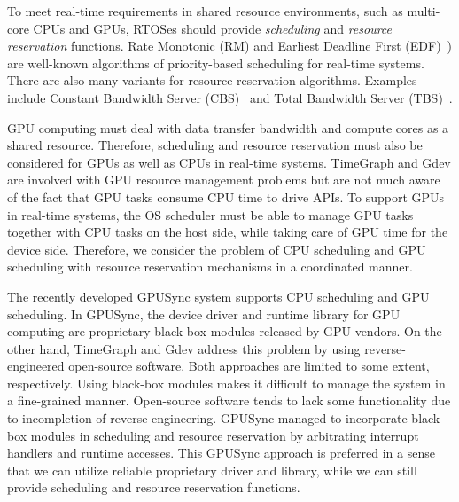 To meet real-time requirements in shared resource environments, such as
multi-core CPUs and GPUs, RTOSes should provide \textit{scheduling} and
\textit{resource reservation} functions.
Rate Monotonic (RM) and Earliest Deadline First (EDF)~\cite{sched:ll})
are well-known algorithms of priority-based scheduling for real-time
systems.
There are also many variants for resource reservation algorithms.
Examples include Constant Bandwidth Server (CBS)~\cite{rr:cbs} and Total
Bandwidth Server (TBS)~\cite{rr:tbs2}.

GPU computing must deal with data transfer bandwidth and compute cores
as a shared resource.
Therefore, scheduling and resource reservation must also be considered
for GPUs as well as CPUs in real-time systems.
TimeGraph and Gdev are involved with GPU resource management problems
but are not much aware of the fact that GPU tasks consume CPU time to
drive APIs.
To support GPUs in real-time systems, the OS scheduler must be able to
manage GPU tasks together with CPU tasks on the host side, while taking
care of GPU time for the device side.
Therefore, we consider the problem of CPU scheduling and GPU scheduling
with resource reservation mechanisms in a coordinated manner.

The recently developed GPUSync system supports CPU scheduling and GPU
scheduling.
In GPUSync, the device driver and runtime library for GPU computing are
proprietary black-box modules released by GPU vendors.
On the other hand, TimeGraph and Gdev address this problem by using
reverse-engineered open-source software.
Both approaches are limited to some extent, respectively.
Using black-box modules makes it difficult to manage the system in a
fine-grained manner.
Open-source software tends to lack some functionality due to
incompletion of reverse engineering.
GPUSync managed to incorporate black-box modules in scheduling and
resource reservation by arbitrating interrupt handlers and runtime
accesses.
This GPUSync approach is preferred in a sense that we can utilize
reliable proprietary driver and library, while we can still provide
scheduling and resource reservation functions.

